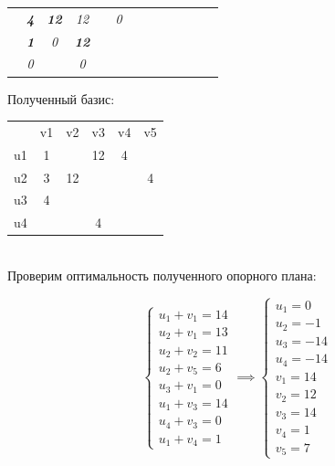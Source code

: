 \documentclass[listings]{labreport}
\begin{document}
{\begin{tabular}{c|c|c|c|c|c|ccccccc}
\multicolumn{1}{c}{} &
  \multicolumn{1}{c}{\textbf{\textit{4}}} &
  \multicolumn{1}{c}{\textbf{\textit{12}}} &
  \multicolumn{1}{c}{\textit{12}} &
  \multicolumn{1}{c}{} &
  \multicolumn{1}{c}{\textit{0}} \\
\multicolumn{1}{c}{} &
  \multicolumn{1}{c}{\textbf{\textit{1}}} &
  \multicolumn{1}{c}{\textit{0}} &
  \multicolumn{1}{c}{\textbf{\textit{12}}} &
  \multicolumn{1}{c}{} &
  \multicolumn{1}{c}{} \\
\multicolumn{1}{c}{} &
  \multicolumn{1}{c}{\textit{0}} &
  \multicolumn{1}{c}{} &
  \multicolumn{1}{c}{\textit{0}} &
  \multicolumn{1}{c}{} &
  \multicolumn{1}{c}{} \\
\end{tabular}}

Полученный базис:

\begin{tabular}{c|c|c|c|c|c|}
\multicolumn{1}{c}{} &
  \multicolumn{1}{c}{v1} &
  \multicolumn{1}{c}{v2} &
  \multicolumn{1}{c}{v3} &
  \multicolumn{1}{c}{v4} &
  \multicolumn{1}{c}{v5} \\ \cline{2-6}
u1 & 1 & & 12 & 4 & \\ \cline{2-6}
u2 & 3 & 12 & & & 4 \\ \cline{2-6}
u3 & 4 & & & & \\ \cline{2-6}
u4 & & & 4 & & \\ \cline{2-6}
\end{tabular}\\[2mm]

Проверим оптимальность полученного опорного плана:

$$
\begin{cases}
  u_1 + v_1 = 14 \\
  u_2 + v_1 = 13 \\
  u_2 + v_2 = 11 \\
  u_2 + v_5 = 6 \\
  u_3 + v_1 = 0 \\
  u_1 + v_3 = 14 \\
  u_4 + v_3 = 0 \\
  u_1 + v_4 = 1
\end{cases}
\implies
\begin{cases}
  u_1 = 0 \\
  u_2 = -1 \\
  u_3 = -14 \\
  u_4 = -14 \\
  v_1 = 14 \\
  v_2 = 12 \\
  v_3 = 14 \\
  v_4 = 1 \\
  v_5 = 7
\end{cases}
$$
\end{document}
